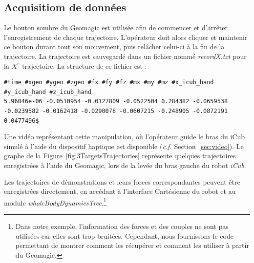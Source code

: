 \documentclass[utf8]{frontiersSCNS} %
\begin{document}

\subsection{Acquisitiom de données}
\label{sec:dataAquisition}
Le bouton sombre du Geomagic est utilisée afin de commencer et d'arrêter l'enregistrement de chaque trajectoire. L'opérateur doit alors cliquer et maintenir ce bouton durant tout son mouvement, puis relâcher celui-ci à la fin de la trajectoire. La trajectoire est sauvegardé dans un fichier nommé \textit{recordX.txt} pour la $X^e$ trajectoire. La structure de ce fichier est :
\begin{lstlisting}
#time #xgeo #ygeo #zgeo #fx #fy #fz #mx #my #mz #x_icub_hand #y_icub_hand #z_icub_hand
5.96046e-06 -0.0510954 -0.0127809 -0.0522504 0.284382 -0.0659538 -0.0239582 -0.0162418 -0.0290078 -0.0607215 -0.248905 -0.0872191 0.0477496$
 \end{lstlisting}


Une vidéo représentant cette manipulation, où l'opérateur guide le bras du iCub simulé à l'aide du dispositif haptique est disponible (\textit{c.f.} Section~\ref{sec:video}).
Le graphe de la Figure~\ref{fig:3TargetsTrajectories} représente quelques trajectoires enregistrées à l'aide du Geomagic, lors de la levée du bras gauche du robot \textit{iCub}.


Les trajectoires de démonstrations et leurs forces correspondantes peuvent être enregistrées directement, en accédant à l'interface Cartésienne du robot et au module \textit{wholeBodyDynamicsTree}.\footnote{Dans notre exemple, l'information des forces et des couples ne sont pas utilisées car elles sont trop bruitées. Cependant, nous fournissons le code permettant de montrer comment les récupérer et comment les utiliser à partir du Geomagic.}
\end{document}
